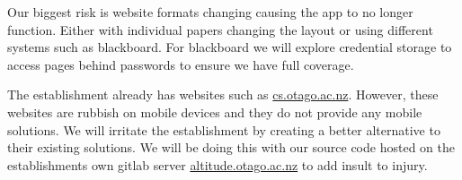 \documentclass{article}
\begin{document}
	Our biggest risk is website formats changing causing the app to no longer function. Either with individual papers changing the layout or using different systems such as blackboard. For blackboard we will explore credential storage to access pages behind passwords to ensure we have full coverage.
	
	The establishment already has websites such as \url{cs.otago.ac.nz}. However, these websites are rubbish on mobile devices and they do not provide any mobile solutions. We will irritate the establishment by creating a better alternative to their existing solutions. We will be doing this with our source code hosted on the establishments own gitlab server \url{altitude.otago.ac.nz} to add insult to injury.
\end{document}
